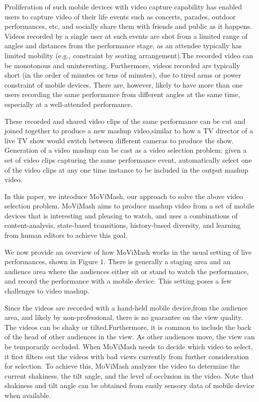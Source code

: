 \documentclass{sig-alternate}
\begin{document}
Proliferation of such mobile devices with video capture capability has enabled users to capture video of their life events such as concerts, parades, outdoor performances, etc, and socially share them with friends and public as it happens. Videos recorded by a single user at such events are shot from a limited range of angles and distances from the performance stage, as an attendee typically has limited mobility (e.g., constraint by seating arrangement).The recorded video can be monotonous and uninteresting. Furthermore, videos recorded are typically short (in the order of minutes or tens of minutes), due to tired arms or power constraint of mobile devices. There are, however, likely to have more than one users recording the same performance from different angles at the same time, especially at a well-attended performance.

These recorded and shared video clips of the same performance can be cut and joined together to produce a new mashup video,similar to how a TV director of a live TV show would switch between different cameras to produce the show. Generation of a video mashup can be cast as a video selection problem: given a set of video clips capturing the same performance event, automatically select one of the video clips at any one time instance to be included in the output mashup video.

In this paper, we introduce MoViMash, our approach to solve the above video selection problem. MoViMash aims to produce mashup video from a set of mobile devices that is interesting and pleasing to watch, and uses a combinations of content-analysis, state-based transitions, history-based diversity, and learning from human editors to achieve this goal.

We now provide an overview of how MoViMash works in the usual setting of live performances, shown in Figure 1. There is generally a staging area and an audience area where the audiences either sit or stand to watch the performance, and record the performance with a mobile device. This setting poses a few challenges to video mashup.

Since the videos are recorded with a hand-held mobile device,from the audience area, and likely by non-professional, there is no guarantee on the view quality. The videos can be shaky or tilted.Furthermore, it is common to include the back of the head of other audiences in the view. As other audiences move, the view can be temporarily occluded. When MoViMash needs to decide which video to select, it first filters out the videos with bad views currently from further consideration for selection. To achieve this, MoViMash analyzes the video to determine the current shakiness, the tilt angle, and the level of occlusion in the video. Note that shakiness and tilt angle can be obtained from easily sensory data of mobile device when available.
\end{document}
